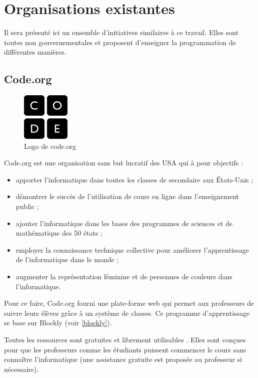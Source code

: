 ﻿\section{Organisations existantes}
Il sera présenté ici un ensemble d'initiatives similaires à ce travail. Elles sont toutes non gouvernementales et proposent d'enseigner la programmation de différentes manières.
\subsection{Code.org}
\begin{figure}[!ht]
  \begin{center}
    \includegraphics[scale=0.5]{content/5-related_work/images/code}
    \caption{Logo de code.org}
    \label{fig:code.org}
  \end{center}
\end{figure}
Code.org \cite{code-org-about} est une organisation sans but lucratif des USA qui à pour objectifs :
\begin{itemize}
  \item apporter l'informatique dans toutes les classes de \gls{secondaire} aux États-Unis ;
  \item démontrer le succès de l'utilisation de cours en ligne dans l'enseignement public ;
  \item ajouter l'informatique dans les bases des programmes de sciences et de mathématique des 50 états ;
  \item employer la connaissance technique collective pour améliorer l'apprentissage de l'informatique dans le monde ;
  \item augmenter la représentation féminine et de personnes de couleurs dans l'informatique.
\end{itemize}

Pour ce faire, Code.org fourni une plate-forme \cite{code-org-20hr} web qui permet aux professeurs de suivre leurs élèves grâce à un système de classes. Ce programme d'apprentissage se base sur Blockly (voir \ref{blockly}).

Toutes les ressources sont gratuites et librement utilisables \cite{code-org-faq}. Elles sont conçues pour que les professeurs comme les étudiants puissent commencer le cours sans connaître l'informatique (une assistance gratuite est proposée au professeur si nécessaire).

